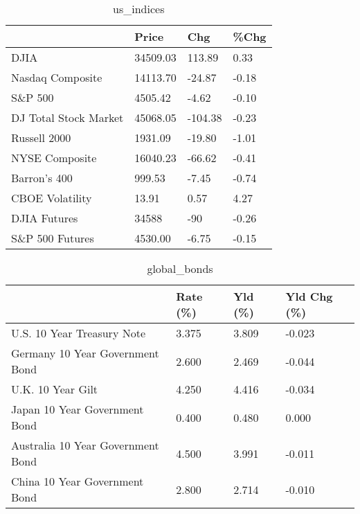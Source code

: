 \documentclass{article}%
\begin{document}
%


\begin{table}[htbp]%
\caption{us\_indices}%
\centering%
\begin{adjustbox}{width=1\textwidth}%
\begin{tabular}{llll}
\toprule
                      &    Price &     Chg &  \%Chg \\
\midrule
                 DJIA & 34509.03 &  113.89 &  0.33 \\
     Nasdaq Composite & 14113.70 &  -24.87 & -0.18 \\
              S\&P 500 &  4505.42 &   -4.62 & -0.10 \\
DJ Total Stock Market & 45068.05 & -104.38 & -0.23 \\
         Russell 2000 &  1931.09 &  -19.80 & -1.01 \\
       NYSE Composite & 16040.23 &  -66.62 & -0.41 \\
         Barron's 400 &   999.53 &   -7.45 & -0.74 \\
      CBOE Volatility &    13.91 &    0.57 &  4.27 \\
         DJIA Futures &    34588 &     -90 & -0.26 \\
      S\&P 500 Futures &  4530.00 &   -6.75 & -0.15 \\
\bottomrule
\end{tabular}
%
\end{adjustbox}%
\end{table}

%


\begin{table}[htbp]%
\caption{global\_bonds}%
\centering%
\begin{adjustbox}{width=1\textwidth}%
\begin{tabular}{llll}
\toprule
                                  & Rate (\%) & Yld (\%) & Yld Chg (\%) \\
\midrule
       U.S. 10 Year Treasury Note &    3.375 &   3.809 &      -0.023 \\
  Germany 10 Year Government Bond &    2.600 &   2.469 &      -0.044 \\
                U.K. 10 Year Gilt &    4.250 &   4.416 &      -0.034 \\
    Japan 10 Year Government Bond &    0.400 &   0.480 &       0.000 \\
Australia 10 Year Government Bond &    4.500 &   3.991 &      -0.011 \\
    China 10 Year Government Bond &    2.800 &   2.714 &      -0.010 \\
\bottomrule
\end{tabular}
%
\end{adjustbox}%
\end{table}
\end{document}

